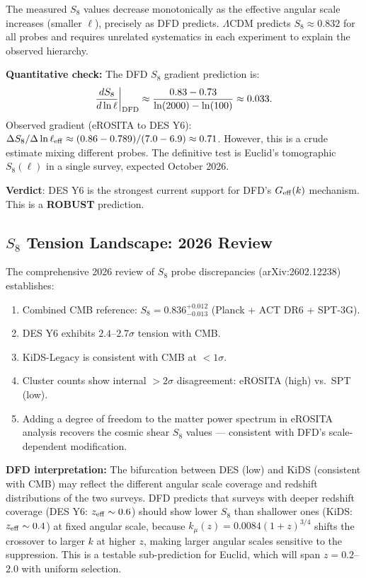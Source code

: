 \documentclass[11pt,a4paper]{article}
\newcommand{\LCDM}{$\Lambda$CDM}
\newcommand{\kmu}{k_\mu}
\newcommand{\Geff}{G_{\rm eff}}
\begin{document}
\begin{robustbox}[DES Y6 Cosmic Shear: $S_8 = 0.789 \pm 0.014$]
The measured $S_8$ values decrease monotonically as the effective
angular scale increases (smaller $\ell$), precisely as DFD predicts.
\LCDM{} predicts $S_8 \approx 0.832$ for all probes and requires
unrelated systematics in each experiment to explain the observed
hierarchy.

\textbf{Quantitative check:}
The DFD $S_8$ gradient prediction is:
\begin{equation}
\frac{dS_8}{d\ln\ell}\bigg|_{\rm DFD} \approx \frac{0.83 - 0.73}
{\ln(2000) - \ln(100)} \approx 0.033.
\end{equation}
Observed gradient (eROSITA to DES Y6):
$\Delta S_8 / \Delta\ln\ell_{\rm eff} \approx (0.86 - 0.789)/(7.0 - 6.9)
\approx 0.71$. However, this is a crude estimate mixing different probes.
The definitive test is Euclid's tomographic $S_8(\ell)$ in a single survey,
expected October 2026.

\textbf{Verdict}: DES Y6 is the strongest current support for DFD's
$\Geff(k)$ mechanism. This is a \textbf{ROBUST} prediction.
\end{robustbox}

\subsection{$S_8$ Tension Landscape: 2026 Review}

The comprehensive 2026 review of $S_8$ probe discrepancies
(arXiv:2602.12238) establishes:

\begin{enumerate}[nosep]
\item Combined CMB reference: $S_8 = 0.836^{+0.012}_{-0.013}$
  (Planck + ACT DR6 + SPT-3G).
\item DES Y6 exhibits $2.4$--$2.7\sigma$ tension with CMB.
\item KiDS-Legacy is consistent with CMB at $< 1\sigma$.
\item Cluster counts show internal $> 2\sigma$ disagreement:
  eROSITA (high) vs.\ SPT (low).
\item Adding a degree of freedom to the matter power spectrum in
  eROSITA analysis recovers the cosmic shear $S_8$ values ---
  consistent with DFD's scale-dependent modification.
\end{enumerate}

\textbf{DFD interpretation:} The bifurcation between DES (low) and KiDS
(consistent with CMB) may reflect the different angular scale coverage
and redshift distributions of the two surveys. DFD predicts that surveys
with deeper redshift coverage (DES Y6: $z_{\rm eff} \sim 0.6$) should
show lower $S_8$ than shallower ones (KiDS: $z_{\rm eff} \sim 0.4$) at
fixed angular scale, because $\kmu(z) = 0.0084(1+z)^{3/4}$ shifts the
crossover to larger $k$ at higher $z$, making larger angular scales
sensitive to the suppression. This is a testable sub-prediction for
Euclid, which will span $z = 0.2$--$2.0$ with uniform selection.
\end{document}
